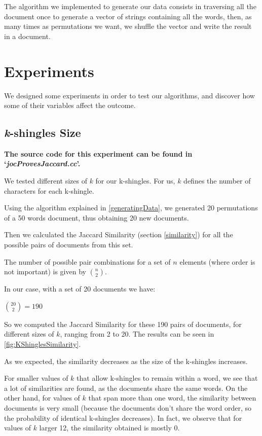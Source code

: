 \documentclass[12pt]{article}
\begin{document}
{The algorithm we implemented to generate our data consists in traversing all the document once to generate a vector of strings containing all the words, then, as many times as permutations we want, we shuffle the vector and write the result in a document. \\

\section{Experiments}
We designed some experiments in order to test our algorithms, and discover how some of their variables affect the outcome.

\subsection{\textit{k}-shingles Size}
\textbf{The source code for this experiment can be found in `\textit{jocProvesJaccard.cc}'.}
\bigskip

We tested different sizes of $k$ for our k-shingles.
For us, $k$ defines the number of characters for each k-shingle.

Using the algorithm explained in \autoref{generatingData}, we generated 20 permutations of a 50 words document, thus obtaining 20 new documents.

Then we calculated the Jaccard Similarity (section \autoref{similarity}) for all the possible pairs of documents from this set.

The number of possible pair combinations for a set of $n$ elements (where order is not important) is given by $\binom{n}{2}$.

In our case, with a set of 20 documents we have:
\bigbreak
\centerline{\large $\binom{20}{2} = 190$}
\bigbreak

So we computed the Jaccard Similarity for these 190 pairs of documents, for different sizes of $k$, ranging from 2 to 20. The results can be seen in \autoref{fig:KShinglesSimilarity}.

\bigbreak
As we expected, the similarity decreases as the size of the k-shingles increases.

For smaller values of $k$ that allow k-shingles to remain within a word, we see that a lot of similarities are found, as the documents share the same words.
On the other hand, for values of $k$ that span more than one word, the similarity between documents is very small (because the documents don't share the word order, so the probability of identical k-shingles decreases).
In fact, we observe that for values of $k$ larger 12, the similarity obtained is mostly 0.

}
\end{document}
